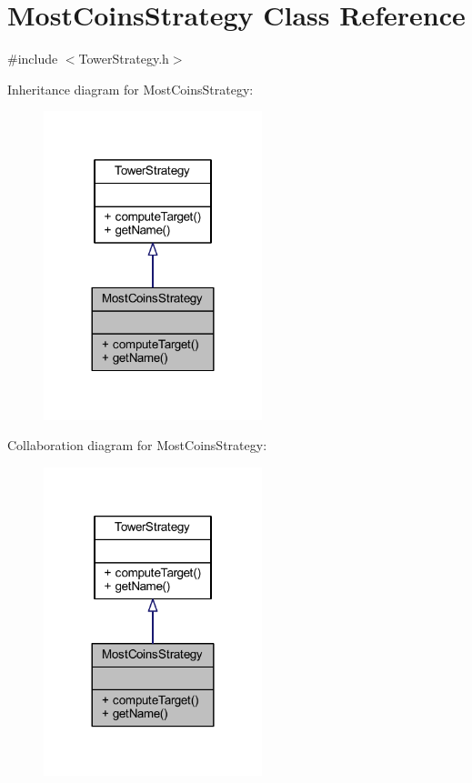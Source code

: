 \hypertarget{class_most_coins_strategy}{\section{Most\+Coins\+Strategy Class Reference}
\label{class_most_coins_strategy}
}


{\ttfamily \#include $<$Tower\+Strategy.\+h$>$}



Inheritance diagram for Most\+Coins\+Strategy\+:
\nopagebreak
\begin{figure}[H]
\begin{center}
\leavevmode
\includegraphics[width=180pt]{class_most_coins_strategy__inherit__graph}
\end{center}
\end{figure}


Collaboration diagram for Most\+Coins\+Strategy\+:
\nopagebreak
\begin{figure}[H]
\begin{center}
\leavevmode
\includegraphics[width=180pt]{class_most_coins_strategy__coll__graph}
\end{center}
\end{figure}
